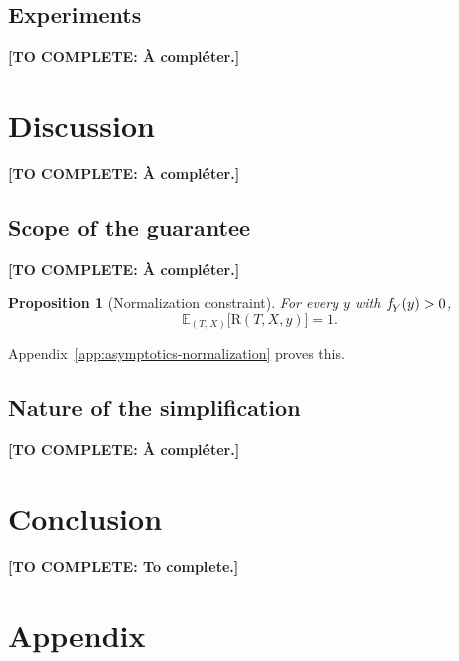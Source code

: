 \documentclass[11pt]{article}
\newcommand{\TODO}[1]{\textbf{[TO COMPLETE: #1]}}
\theoremstyle{plain}
\newtheorem{mypropo}{Proposition}
\theoremstyle{definition}
\theoremstyle{remark}
\newcommand{\pE}{\ensuremath{\mathbb{E}}}
\newcommand{\pf}[1]{\ensuremath{\,\mathlarger{\textit{f}}_{#1}}}
\newcommand{\DensityRatio}{\text{R}}
\begin{document}
\subsection{Experiments}
\label{sec:sim-experiments}

\TODO{À compléter.}

\section{Discussion}
\label{sec:discussion}

\TODO{À compléter.}

\subsection{Scope of the guarantee}
\label{sec:discussion-dr}

\TODO{À compléter.}

\begin{mypropo}[Normalization constraint]
\label{prop:normalization}
For every $y$ with $\pf{Y}(y) > 0$,
\begin{equation}
\pE_{(T,X)}\big[ \DensityRatio(T,X,y) \big] = 1 .
\label{eq:normalization}
\end{equation}
\end{mypropo}

Appendix~\ref{app:asymptotics-normalization} proves this.

\subsection{Nature of the simplification}
\label{sec:discussion-simpler}

\TODO{À compléter.}

\section{Conclusion}
\label{sec:conclusion}

\TODO{To complete.}




\clearpage
\appendix

\section*{Appendix}
\end{document}
